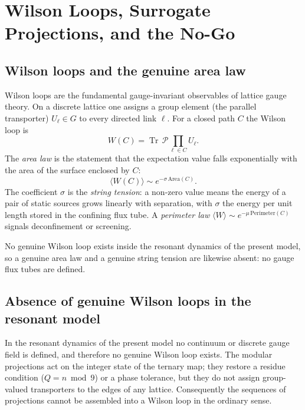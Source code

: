 
\chapter{Wilson Loops, Surrogate Projections, and the No-Go}
\label{ch:wilson-surrogate}

\section{Wilson loops and the genuine area law}

Wilson loops are the fundamental gauge-invariant observables of lattice gauge
theory. On a discrete lattice one assigns a group element (the parallel
transporter) \(U_\ell\in G\) to every directed link \(\ell\). For a closed path
\(C\) the Wilson loop is
\begin{equation}
W(C)
=\operatorname{Tr}\,
\mathcal{P}
\prod_{\ell\in C} U_\ell.
\end{equation}
The \emph{area law} is the statement that the expectation value falls
exponentially with the area of the surface enclosed by \(C\):
\begin{equation}
\langle W(C)\rangle \sim e^{-\sigma\,\mathrm{Area}(C)}.
\end{equation}
The coefficient \(\sigma\) is the \emph{string tension}: a non-zero value means
the energy of a pair of static sources grows linearly with separation, with
\(\sigma\) the energy per unit length stored in the confining flux tube. A
\emph{perimeter law} \(\langle W\rangle\sim e^{-\mu\,\mathrm{Perimeter}(C)}\)
signals deconfinement or screening.

No genuine Wilson loop exists inside the resonant dynamics of the present model,
so a genuine area law and a genuine string tension are likewise absent: no gauge
flux tubes are defined.

\section{Absence of genuine Wilson loops in the resonant model}

In the resonant dynamics of the present model no continuum or discrete gauge
field is defined, and therefore no genuine Wilson loop exists. The modular
projections act on the integer state of the ternary map; they restore a residue
condition (\(Q=n\bmod 9\)) or a phase tolerance, but they do not assign
group-valued transporters to the edges of any lattice. Consequently the
sequences of projections cannot be assembled into a Wilson loop in the ordinary
sense.

